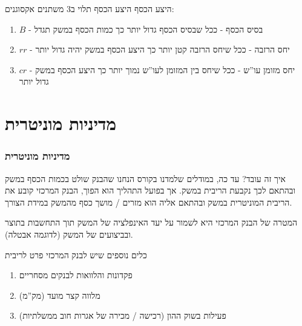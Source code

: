 \documentclass[usenames,dvipsnames]{beamer}
\begin{document}
\begin{RTL}
\begin{frame}[allowframebreaks]
    \begin{block}{היצע הכסף}
        היצע הכסף תלוי ב3 משתנים אקסוגנים:
        \begin{enumerate}
            \item $B$ - בסיס הכסף - ככל שבסיס הכסף גדול יותר כך כמות הכסף במשק תגדל
            \item $rr$ - יחס הרזבה - ככל שיחס הרזבה קטן יותר כך היצע הכסף במשק יהיה גדול יותר
            \item $cr$ - יחס מזומן עו''ש - ככל שיחס בין המזומן לעו''ש נמוך יותר כך היצע הכסף במשק גדול יותר
        \end{enumerate}
    \end{block}
    

\end{frame}


\section{מדיניות מוניטרית}
\begin{frame}[allowframebreaks]
    \frametitle{מדיניות מוניטרית}
    \begin{block}{איך זה עובד?}
        עד כה, במודלים שלמדנו בקורס הנחנו שהבנק שולט בכמות הכסף במשק ובהתאם לכך נקבעת הריבית במשק.
    אך בפועל התהליך הוא הפוך, הבנק המרכזי קובע את הריבית המוניטרית במשק ובהתאם אליה הוא מזרים / מושך כסף מהמשק במידת הצורך.


    \end{block}
    המטרה של הבנק המרכזי היא לשמור על יעד האינפלציה של המשק תוך התחשבות בתוצר ובביצועים של המשק (לדוגמה אבטלה).

    \begin{block}{כלים נוספים שיש לבנק המרכזי פרט לריבית}
        \begin{enumerate}
            \item פקדונות והלוואות לבנקים מסחריים
            \item מלווה קצר מועד (מק''מ)
            \item פעילות בשוק ההון (רכישה / מכירה של אגרות חוב ממשלתיות)
        \end{enumerate}
    \end{block}
    

\end{frame}
\end{RTL}
\end{document}
